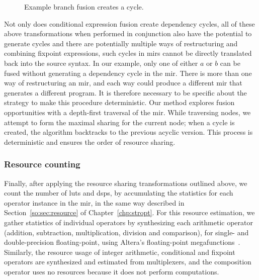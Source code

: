 \begin{figure}[ht]
{
        {}\label{po:fig:mir_cond_fusion_4}
    }
    \caption{Example branch fusion creates a cycle.}
\end{figure}

Not only does conditional expression fusion create dependency cycles, all
of these above transformations when performed in conjunction also have the
potential to generate cycles and there are potentially multiple ways of
restructuring and combining fixpoint expressions, such cycles in \glspl{mir}
cannot be directly translated back into the source syntax.  In our example,
only one of either $a$ or $b$ can be fused without generating a dependency
cycle in the \gls{mir}\@.  There is more than one way of restructuring an
\gls{mir}, and each way could produce a different \gls{mir} that generates a
different program.  It is therefore necessary to be specific about the strategy
to make this procedure deterministic.  Our method explores fusion opportunities
with a depth-first traversal of the \gls{mir}\@.  While traversing nodes,
we attempt to form the maximal sharing for the current node; when a cycle
is created, the algorithm backtracks to the previous acyclic version.  This
process is deterministic and ensures the order of resource sharing.


\subsubsection{Resource counting}

Finally, after applying the resource sharing transformations outlined above, we
count the number of \glspl{lut} and \glspl{dsp}, by accumulating the statistics
for each operator instance in the \gls{mir}, in the same way described in
Section~\ref{so:sec:resource} of Chapter~\ref{chp:stropt}.  For this resource
estimation, we gather statistics of individual operators by synthesizing each
arithmetic operator (addition, subtraction, multiplication, division and
comparison), for single- and double-precision floating-point, using Altera's
floating-point megafunctions~\cite{altfp}.  Similarly, the resource usage of
integer arithmetic, conditional and fixpoint operators are synthesized and
estimated from multiplexers, and the composition operator uses no resources
because it does not perform computations.

